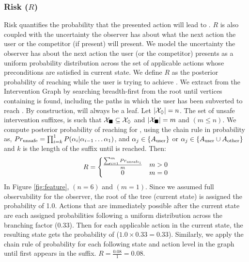 \subsubsection{Risk ($R$)}
Risk quantifies the probability that the presented action will lead to \undesired.
$R$ is also coupled with the uncertainty the observer has about what the next action the user or the competitor (if present) will present. 
We model the uncertainty the observer has about the next action the user (or the competitor) presents as a uniform probability distribution across the set of applicable actions whose preconditions are satisfied in current state. 
We define $R$ as the posterior probability of reaching \undesired while the user is trying to achieve \desired. 
We extract \Suffixes from the Intervention Graph by searching breadth-first from the root until vertices containing \desired is found, including the paths in which the user has been subverted to reach \undesired. 
By construction, \desired will always be a leaf.
Let $\left | \mathcal{X}_\Diamond \right |=n$. 
The set of unsafe intervention suffixes, \SuffixesUnsafe is such that $\mathcal{X}_{\blacksquare} \subseteq \mathcal{X}_\Diamond$ and $\left | \mathcal{X}_{\blacksquare} \right |=m$ and $(m\leq n)$.
We compute posterior probability of reaching \undesired for \SuffixesUnsafe, using the chain rule in probability as, 
$Pr_{\textnormal{unsafe}}=\prod_{i=k}^{1}P(\alpha_i|\alpha_{i-1}\ldots \alpha_1)$, and $\alpha_{j} \in \lbrace A_{\textnormal{user}}\rbrace$ or $\alpha_j\in\lbrace A_{\textnormal{user}}\cup A_{\textnormal{other}}\rbrace$ and $k$ is the length of the suffix until \undesired is reached. Then: 
\begin{equation*} 
R = \left\{\begin{matrix} \frac{\sum_{i=1}^{m}Pr_{\textnormal{unsafe}_i}}{m} & m>0\\ 0 &  m=0 \end{matrix}\right.
\end{equation*}
In Figure \ref{fig:feature}, $(n=6)$ and $(m=1)$. 
Since we assumed full observability for the observer, the root of the tree (current state) is assigned the probability of 1.0. 
Actions that are immediately possible after the current state are each assigned probabilities following a uniform distribution across the branching factor (0.33). 
Then for each applicable action in the current state, the resulting state gets the probability of ($1.0\times0.33=0.33$). 
Similarly, we apply the chain rule of probability for each following state and action level in the graph until \undesired first appears in the suffix. $R=\frac{0.08}{1}=0.08$.

